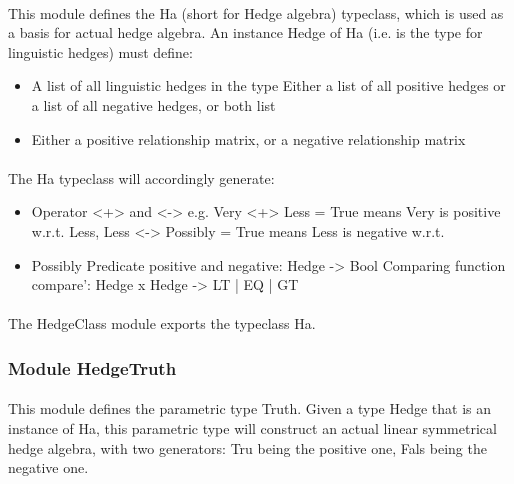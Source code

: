 \documentclass[../gr-final.tex]{subfiles}
\begin{document}
\paragraph{}This module defines the Ha (short for Hedge algebra) typeclass, which is used as a basis for  actual hedge algebra. An instance Hedge of Ha (i.e. is the type for linguistic hedges) must define:

\begin{itemize}
\item A list of all linguistic hedges in the type Either a list of all
  positive hedges or a list of all negative hedges, or both list
\item  Either a positive relationship matrix, or a negative relationship
  matrix
\end{itemize}

\paragraph{}The Ha typeclass will accordingly generate:

\begin{itemize}
\item Operator <+> and <-> e.g. Very <+> Less = True means Very is
  positive w.r.t. Less, Less <-> Possibly = True means Less is
  negative w.r.t. 
\item Possibly Predicate positive and negative: Hedge ->
  Bool Comparing function compare': Hedge x Hedge -> LT | EQ | GT
\end{itemize}

\paragraph{}The HedgeClass module exports the typeclass Ha.

\subsubsection{Module HedgeTruth}


\paragraph{}This module defines the parametric type Truth. Given
a type Hedge that is an instance of Ha, this parametric type will
construct an actual linear symmetrical hedge algebra, with two
generators: Tru being the positive one, Fals being the negative
one. \\
\end{document}

